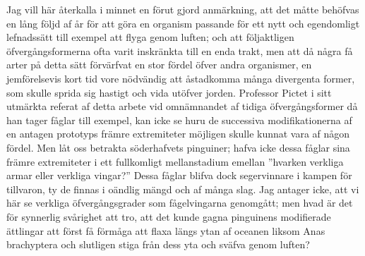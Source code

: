 Jag vill här återkalla i minnet en förut gjord anmärkning, att det måtte behöfvas en lång följd af år för att göra en organism passande för ett nytt och egendomligt lefnadssätt till exempel att flyga genom luften; och att följaktligen öfvergångsformerna ofta varit inskränkta till en enda trakt, men att då några få arter på detta sätt förvärfvat en stor fördel öfver andra organismer, en jemförelsevis kort tid vore nödvändig att åstadkomma många divergenta former, som skulle sprida sig hastigt och vida utöfver jorden. Professor Pictet i sitt utmärkta referat af detta arbete vid omnämnandet af tidiga öfvergångsformer då han tager fåglar till exempel, kan icke se huru de successiva modifikationerna af en antagen prototyps främre extremiteter möjligen skulle kunnat vara af någon fördel. Men låt oss betrakta söderhafvets pinguiner; hafva icke dessa fåglar sina främre extremiteter i ett fullkomligt mellanstadium emellan ”hvarken verkliga armar eller verkliga vingar?” Dessa fåglar blifva dock segervinnare i kampen för tillvaron, ty de finnas i oändlig mängd och af många slag. Jag antager icke, att vi här se verkliga öfvergångsgrader som fågelvingarna genomgått; men hvad är det för synnerlig svårighet att tro, att det kunde gagna pinguinens modifierade ättlingar att först få förmåga att flaxa längs ytan af oceanen liksom Anas brachyptera och slutligen stiga från dess yta och sväfva genom luften?

